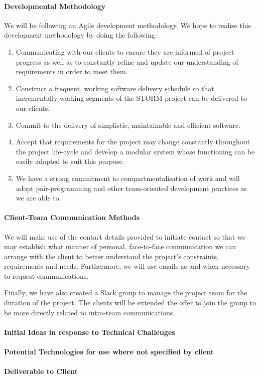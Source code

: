 \documentclass[12pt]{article}
\begin{document}
\paragraph{Developmental Methodology}
We will be following an Agile development methodology. We hope to realise this development methodology by doing the following:
\begin{enumerate}
\item Communicating with our clients to ensure they are informed of project progress as well as to constantly refine and update our understanding of requirements in order to meet them.
\item Construct a frequent, working software delivery schedule so that incrementally working segments of the STORM project can be delivered to our clients.
\item Commit to the delivery of simplistic, maintainable and efficient software.
\item Accept that requirements for the project may change constantly throughout the project life-cycle and develop a modular system whose functioning can be easily adapted to suit this purpose.
\item We have a strong commitment to compartmentalisation of work and will adopt pair-programming and other team-oriented development practices as we are able to.
\end{enumerate}

\paragraph{Client-Team Communication Methods}
We will make use of the contact details provided to initiate contact so that we may establish what manner of personal, face-to-face communication we can arrange with the client to better understand the project's constraints, requirements and needs. Furthermore, we will use emails as and when necessary to request communications.

Finally, we have also created a Slack group to manage the project team for the duration of the project. The clients will be extended the offer to join the group to be more directly related to intra-team communications.
\paragraph{Initial Ideas in response to Technical Challenges}
\paragraph{Potential Technologies for use where not specified by client}
\paragraph{Deliverable to Client}
\end{document}
